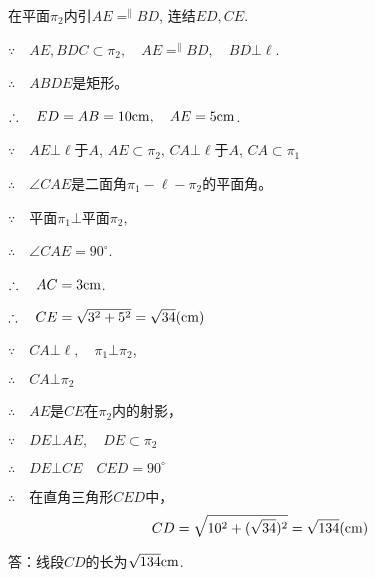 \begin{solution}
  在平面$\pi_2$内引$AE\displaystyle\mathop{=}^{\parallel}BD$, 连结$ED,CE$.

$\because\quad   AE,BDC\subset \pi_2,\quad AE\displaystyle\mathop{=}^{\parallel}BD,\quad BD\bot \ell$.

$\therefore\quad  ABDE$是矩形。

$\therefore\quad ED=AB=10{\rm cm},\quad AE=5{\rm cm}$.

$\because\quad   AE\bot \ell$于$A$, $AE\subset \pi_2$, $CA\bot \ell$于$A$, $CA\subset \pi_1$

$\therefore\quad \angle CAE$是二面角$\pi_1-\ell-\pi_2$的平面角。

$\because\quad $平面$\pi_1\bot$平面$\pi_2$,

$\therefore\quad\angle CAE=90^{\circ}$.

$\therefore\quad AC=3{\rm cm}$.

$\therefore\quad CE=\sqrt{3^2+5^2}=\sqrt{34}{\rm (cm)}$

$\because\quad CA\bot\ell,\quad \pi_1\bot \pi_2$,

$\therefore\quad CA\bot \pi_2$

$\therefore\quad AE$是$CE$在$\pi_2$内的射影，

$\because\quad DE\bot AE,\quad DE\subset \pi_2$

$\therefore\quad DE\bot CE\quad CED=90^{\circ}$

$\therefore\quad $在直角三角形$CED$中，
\[CD=\sqrt{10^2+(\sqrt{34})^2}=\sqrt{134}{\rm (cm)}\]

答：线段$CD$的长为$\sqrt{134}{\rm cm}$.
\end{solution}    


